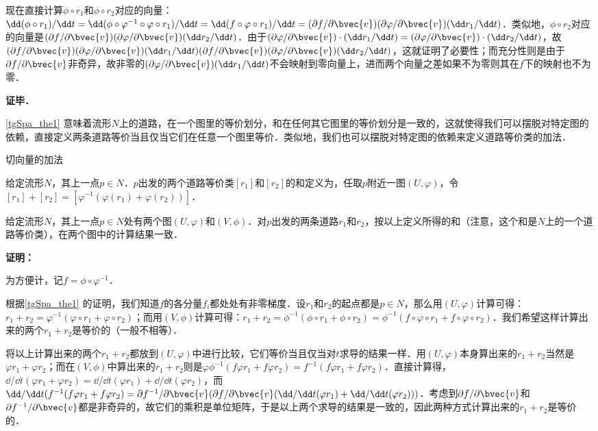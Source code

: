 现在直接计算$\phi\circ r_1$和$\phi\circ r_2$对应的向量：$\dd(\phi\circ r_1)/\dd t=\dd(\phi\circ\varphi^{-1}\circ\varphi\circ r_1)/\dd t=\dd(f\circ\varphi\circ r_1)/\dd t=(\partial f/\partial\bvec{v})(\partial\varphi/\partial\bvec{v})(\dd r_1/\dd t)$．类似地，$\phi\circ r_2$对应的向量是$(\partial f/\partial\bvec{v})(\partial\varphi/\partial\bvec{v})(\dd r_2/\dd t)$．由于$(\partial\varphi/\partial\bvec{v})\cdot(\dd r_1/\dd t)=(\partial\varphi/\partial\bvec{v})\cdot(\dd r_2/\dd t)$，故$(\partial f/\partial\bvec{v})(\partial\varphi/\partial\bvec{v})(\dd r_1/\dd t)(\partial f/\partial\bvec{v})(\partial\varphi/\partial\bvec{v})(\dd r_2/\dd t)$，这就证明了必要性；而充分性则是由于$\partial f/\partial\bvec{v}$非奇异，故非零的$(\partial\varphi/\partial\bvec{v})(\dd r_1/\dd t)$不会映射到零向量上，进而两个向量之差如果不为零则其在$f$下的映射也不为零．


\textbf{证毕．}

\autoref{tgSpa_the1} 意味着流形$N$上的道路，在一个图里的等价划分，和在任何其它图里的等价划分是一致的，这就使得我们可以摆脱对特定图的依赖，直接定义两条道路等价当且仅当它们在任意一个图里等价．类似地，我们也可以摆脱对特定图的依赖来定义道路等价类的加法．

\begin{definition}{切向量的加法}\label{tgSpa_def1}

给定流形$N$，其上一点$p\in N$．$p$出发的两个道路等价类$[r_1]$和$[r_2]$的和定义为，任取$p$附近一图$(U, \varphi)$，令$[r_1]+[r_2]=[\varphi^{-1}(\varphi(r_1)+\varphi(r_2))]$．

\end{definition}

\begin{theorem}{}
给定流形$N$，其上一点$p\in N$处有两个图$(U, \varphi)$和$(V, \phi)$．对$p$出发的两条道路$r_1$和$r_2$，按以上定义所得的和（注意，这个和是$N$上的一个道路等价类），在两个图中的计算结果一致．
\end{theorem}

\textbf{证明：}

为方便计，记$f=\phi\circ\varphi^{-1}$．

根据\autoref{tgSpa_the1} 的证明，我们知道$f$的各分量$f_i$都处处有非零梯度．设$r_1$和$r_2$的起点都是$p\in N$，那么用$(U, \varphi)$计算可得：$r_1+r_2=\varphi^{-1}(\varphi\circ r_1+\varphi\circ r_2)$；而用$(V, \phi)$计算可得：$r_1+r_2=\phi^{-1}(\phi\circ r_1+\phi\circ r_2)=\phi^{-1}(f\circ\varphi\circ r_1+f\circ\varphi\circ r_2)$．我们希望这样计算出来的两个$r_1+r_2$是等价的（一般不相等）．

将以上计算出来的两个$r_1+r_2$都放到$(U, \varphi)$中进行比较，它们等价当且仅当对$t$求导的结果一样．用$(U, \varphi)$本身算出来的$r_1+r_2$当然是$\varphi r_1+\varphi r_2$；而在$(V, \phi)$中算出来的$r_1+r_2$则是$\varphi\phi^{-1}(f\varphi r_1+f\varphi r_2)=f^{-1}(f\varphi r_1+f\varphi r_2)$．直接计算得，$\dd/\dd t(\varphi r_1+\varphi r_2)=\dd/\dd t(\varphi r_1)+\dd/\dd t(\varphi r_2)$，而$\dd/\dd t(f^{-1}(f\varphi r_1+f\varphi r_2)=\partial f^{-1}/\partial\bvec{v}(\partial f/\partial\bvec{v}(\dd/\dd t(\varphi r_1)+\dd/\dd t(\varphi r_2)))$．考虑到$\partial f/\partial\bvec{v}$和$\partial f^{-1}/\partial\bvec{v}$都是非奇异的，故它们的乘积是单位矩阵，于是以上两个求导的结果是一致的，因此两种方式计算出来的$r_1+r_2$是等价的．


